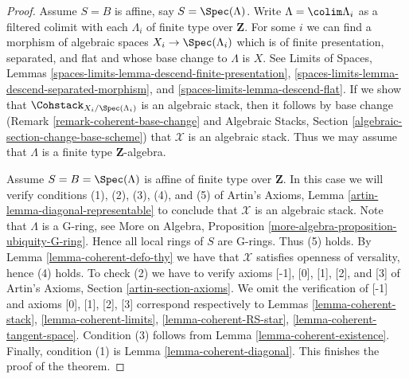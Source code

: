 \begin{proof}
\medskip\noindent
Assume $S = B$ is affine, say $S = \Spec(\Lambda)$.
Write $\Lambda = \colim \Lambda_i$ as a filtered colimit with each $\Lambda_i$
of finite type over $\mathbf{Z}$. For some $i$ we can find
a morphism of algebraic spaces $X_i \to \Spec(\Lambda_i)$
which is of finite presentation, separated, and flat and whose base change
to $\Lambda$ is $X$. See
Limits of Spaces, Lemmas
\ref{spaces-limits-lemma-descend-finite-presentation},
\ref{spaces-limits-lemma-descend-separated-morphism}, and
\ref{spaces-limits-lemma-descend-flat}.
If we show that $\Cohstack_{X_i/\Spec(\Lambda_i)}$ is an
algebraic stack, then it follows by base change
(Remark \ref{remark-coherent-base-change} and
Algebraic Stacks, Section \ref{algebraic-section-change-base-scheme})
that $\mathcal{X}$ is an algebraic stack.
Thus we may assume that $\Lambda$ is a finite type $\mathbf{Z}$-algebra.

\medskip\noindent
Assume $S = B = \Spec(\Lambda)$ is affine of finite type over $\mathbf{Z}$.
In this case we will verify conditions (1), (2), (3), (4), and (5) of
Artin's Axioms, Lemma \ref{artin-lemma-diagonal-representable}
to conclude that $\mathcal{X}$ is an algebraic stack.
Note that $\Lambda$ is a G-ring, see
More on Algebra, Proposition \ref{more-algebra-proposition-ubiquity-G-ring}.
Hence all local rings of $S$ are G-rings. Thus (5) holds.
By Lemma \ref{lemma-coherent-defo-thy}
we have that $\mathcal{X}$ satisfies openness of versality, hence (4) holds.
To check (2) we have to verify axioms [-1], [0], [1], [2], and [3]
of Artin's Axioms, Section \ref{artin-section-axioms}.
We omit the verification of [-1] and axioms
[0], [1], [2], [3] correspond respectively to
Lemmas \ref{lemma-coherent-stack},
\ref{lemma-coherent-limits},
\ref{lemma-coherent-RS-star},
\ref{lemma-coherent-tangent-space}.
Condition (3) follows from Lemma \ref{lemma-coherent-existence}.
Finally, condition (1) is Lemma \ref{lemma-coherent-diagonal}.
This finishes the proof of the theorem.
\end{proof}
